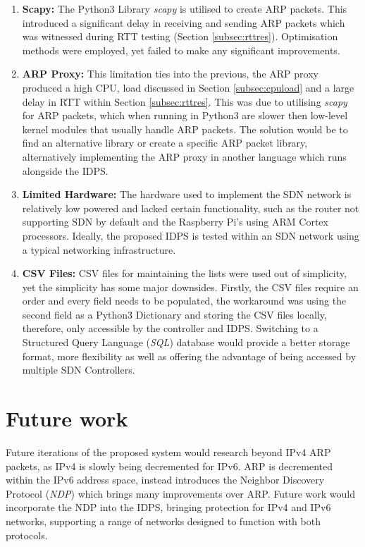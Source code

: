 \documentclass[12pt, oneside]{book}
\begin{document}
\begin{enumerate}
  \itemsep0em
  \item \textbf{Scapy:} The Python3 Library \emph{scapy} is utilised to create ARP packets. This introduced a significant delay
    in receiving and sending ARP packets which was witnessed during RTT testing (Section \ref{subsec:rttres}).
    Optimisation methods were employed, yet failed to make any significant improvements.
\item \textbf{ARP Proxy:} This limitation ties into the previous, the ARP proxy produced a high CPU, load discussed in
    Section \ref{subsec:cpuload} and a large delay in RTT within Section \ref{subsec:rttres}. This was due to utilising
    \emph{scapy} for ARP packets, which when running in Python3 are slower then low-level kernel modules that usually handle
    ARP packets. The solution would be to find an alternative library or create a specific ARP packet
    library, alternatively implementing the ARP proxy in another language which runs alongside the IDPS.
\item \textbf{Limited Hardware:} The hardware used to implement the SDN network is relatively low powered and lacked certain functionality,
    such as the router not supporting SDN by default and the Raspberry Pi's using ARM Cortex processors. Ideally, the proposed IDPS
    is tested within an SDN network using a typical networking infrastructure.
\item \textbf{CSV Files:} CSV files for maintaining the lists were used out of simplicity, yet the simplicity
    has some major downsides. Firstly, the CSV files require an order and every field needs to be populated, the workaround was using the second 
    field as a Python3 Dictionary and storing the CSV files locally, therefore, only accessible by the controller and IDPS.
    Switching to a
    Structured Query Language (\emph{SQL}) database would provide a better storage format, more flexibility as well as offering 
    the advantage of being accessed by multiple SDN Controllers.
\end{enumerate}

\section{Future work}
Future iterations of the proposed system would research beyond IPv4 ARP packets, as IPv4 is slowly being decremented for IPv6.
ARP is decremented within the IPv6 address space, instead introduces the Neighbor Discovery Protocol (\emph{NDP}) which brings
many improvements over ARP. Future work would incorporate the NDP into the IDPS, bringing protection for IPv4 and IPv6 
networks, supporting a range of networks designed to function with both protocols.
\end{document}
